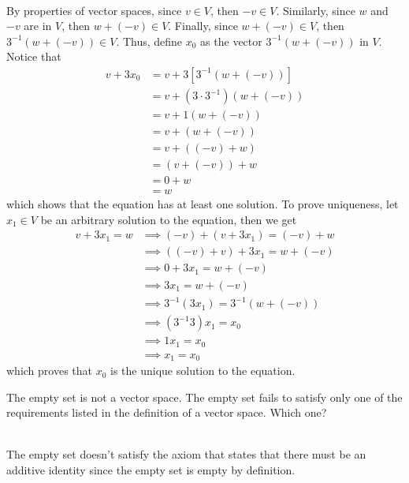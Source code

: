 \begin{solution}
    \\ By properties of vector spaces, since $v \in V$, then $-v \in V$. Similarly, since $w$ and $-v$ are in $V$, then $w + (-v) \in V$. Finally, since $w + (-v) \in V$, then $3^{-1}(w + (-v)) \in V$. Thus, define $x_0$ as the vector $3^{-1}(w + (-v))$ in $V$. Notice that
    \begin{align*}
        v + 3x_0 &= v + 3[3^{-1}(w + (-v))] \\
        &= v + (3 \cdot 3^{-1})(w + (-v)) \\
        &= v + 1(w + (-v)) \\
        &= v + (w + (-v)) \\
        &= v + ((-v) + w) \\
        &= (v + (-v)) + w \\
        &= 0 + w \\
        &= w
    \end{align*}
    which shows that the equation has at least one solution. To prove uniqueness, let $x_1 \in V$ be an arbitrary solution to the equation, then we get
    \begin{align*}
        v + 3x_1 = w &\implies (-v) + (v + 3x_1) = (-v) + w \\
        &\implies ((-v) + v) + 3x_1 = w + (-v) \\
        &\implies 0 + 3x_1 = w + (-v) \\
        &\implies 3x_1 = w + (-v) \\
        &\implies 3^{-1}(3x_1) = 3^{-1}(w + (-v)) \\
        &\implies (3^{-1}3)x_1 = x_0 \\
        &\implies 1x_1 = x_0 \\
        &\implies x_1 = x_0
    \end{align*} 
    which proves that $x_0$ is the unique solution to the equation. \\
\end{solution}

\begin{exercise}
    The empty set is not a vector space. The empty set fails to satisfy only one of the requirements listed in the definition of a vector space. Which one? \\
\end{exercise}

\begin{solution}
    \\ The empty set doesn't satisfy the axiom that states that there must be an additive identity since the empty set is empty by definition.\\
\end{solution}

